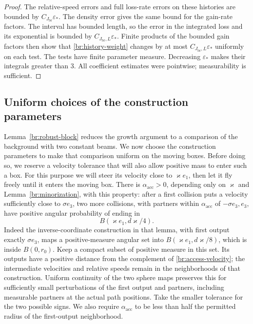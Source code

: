 \begin{proof}
The relative-speed errors and full loss-rate errors on these histories
are bounded by \(C_{J_{\mathrm{br}}}\varepsilon_*\). The density error gives the same
bound for the gain-rate factors. The interval has bounded length,
so the error in the integrated loss and its exponential is bounded
by \(C_{J_{\mathrm{br}},L}\varepsilon_*\). Finite products of the bounded gain factors
then show that \eqref{br:history-weight} changes by at most
\(C_{J_{\mathrm{br}},L}\varepsilon_*\) uniformly on each test. The tests have finite
parameter measure. Decreasing \(\varepsilon_*\) makes their integrals
greater than 3. All coefficient estimates were pointwise; measurability
is sufficient.
\end{proof}

\subsection{Uniform choices of the construction parameters}

Lemma~\ref{br:robust-block} reduces the growth argument to a comparison
of the background with two constant beams. We now choose the
construction parameters to make that comparison uniform on the moving
boxes. Before doing so, we reserve a velocity tolerance that will also
allow positive mass to enter such a box. For this purpose we will steer
its velocity close to \(\varkappa e_1\), then let it fly freely until it
enters the moving box. There is
\(\alpha_{\mathrm{acc}}>0\), depending only on \(\varkappa\) and
Lemma~\ref{br:minorization}, with this property: after a first collision
puts a velocity sufficiently close to \(\sigma e_3\), two more
collisions, with partners within \(\alpha_{\mathrm{acc}}\) of
\(-\sigma e_3,e_3\), have positive angular probability of ending in
\begin{equation}\label{br:access-velocity}
B(\varkappa e_1,d\varkappa/4).
\end{equation}
Indeed the inverse-coordinate construction in that lemma, with first
output exactly \(\sigma e_3\), maps a positive-measure angular set into
\(B(\varkappa e_1,d\varkappa/8)\), which is inside \(B(0,r_0)\).
Keep a compact subset of positive measure in this set. Its outputs
have a positive distance from the complement of
\eqref{br:access-velocity}; the intermediate velocities and relative
speeds remain in the neighborhoods of that construction. Uniform
continuity of the two sphere maps preserves this for sufficiently
small perturbations of the first output and partners, including
measurable partners at the actual path positions. Take the smaller
tolerance for the two possible signs. We also require
\(\alpha_{\mathrm{acc}}\) to be less than half the permitted radius
of the first-output neighborhood.

